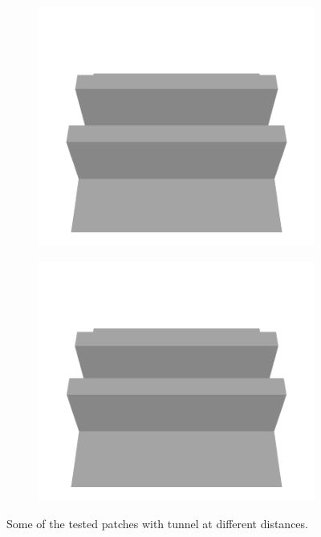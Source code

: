 \documentclass[../document.tex]{subfiles}
\begin{document}
\begin{figure}[htbp]
\begin{subfigure}[b]{0.24\textwidth}
    \includegraphics[width=\linewidth]{../img/5/custom_patches/tunnel/all/08-3d.png}
    \end{subfigure}
    \begin{subfigure}[b]{0.24\textwidth}
    \includegraphics[width=\linewidth]{../img/5/custom_patches/tunnel/all/09-3d.png}
    \end{subfigure}
    \caption{Some of the tested patches with tunnel at different distances.}
    \label{fig : tunnels}
\end{figure}
\end{document}
